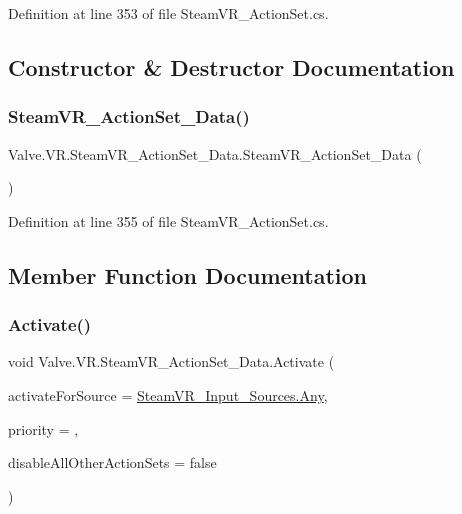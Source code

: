 Definition at line 353 of file Steam\+V\+R\+\_\+\+Action\+Set.\+cs.



\subsection{Constructor \& Destructor Documentation}
\mbox{\label{class_valve_1_1_v_r_1_1_steam_v_r___action_set___data_a9a42fdc5c1399070dfcab2007a15ce05}} 
\subsubsection{\texorpdfstring{SteamVR\_ActionSet\_Data()}{SteamVR\_ActionSet\_Data()}}
{\footnotesize\ttfamily Valve.\+V\+R.\+Steam\+V\+R\+\_\+\+Action\+Set\+\_\+\+Data.\+Steam\+V\+R\+\_\+\+Action\+Set\+\_\+\+Data (\begin{DoxyParamCaption}{ }\end{DoxyParamCaption})}



Definition at line 355 of file Steam\+V\+R\+\_\+\+Action\+Set.\+cs.



\subsection{Member Function Documentation}
\mbox{\label{class_valve_1_1_v_r_1_1_steam_v_r___action_set___data_ad085a17ebd6286a224d27d38ac913597}} 
\subsubsection{\texorpdfstring{Activate()}{Activate()}}
{\footnotesize\ttfamily void Valve.\+V\+R.\+Steam\+V\+R\+\_\+\+Action\+Set\+\_\+\+Data.\+Activate (\begin{DoxyParamCaption}\item[{\mbox{\hyperlink{namespace_valve_1_1_v_r_a82e5bf501cc3aa155444ee3f0662853f}{Steam\+V\+R\+\_\+\+Input\+\_\+\+Sources}}}]{activate\+For\+Source = {\ttfamily \mbox{\hyperlink{namespace_valve_1_1_v_r_a82e5bf501cc3aa155444ee3f0662853faed36a1ef76a59ee3f15180e0441188ad}{Steam\+V\+R\+\_\+\+Input\+\_\+\+Sources.\+Any}}},  }\item[{int}]{priority = {},  }\item[{bool}]{disable\+All\+Other\+Action\+Sets = {\ttfamily false} }\end{DoxyParamCaption})}



